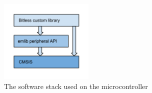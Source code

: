 \begin{figure}[H]
    \centering
    \includegraphics[height=150px]{figures/sw/software-stack.png}
    \caption{The software stack used on the microcontroller}
    \label{fig:software-stack}
\end{figure}
